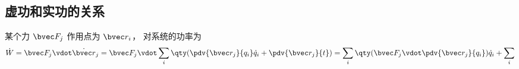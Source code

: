 
\subsection{虚功和实功的关系}
某个力 $\bvec F_j$ 作用点为 $\bvec r_i$， 对系统的功率为
\begin{equation}
\dot W = \bvec F_j \vdot \dot {\bvec r}_j
= \bvec F_j \vdot \sum_i \qty(\pdv{\bvec r_j}{q_i} \dot q_i + \pdv{\bvec r_j}{t})
= \sum_i \qty(\bvec F_j \vdot \pdv{\bvec r_j}{q_i}) \dot q_i + \sum_i 
\end{equation}
